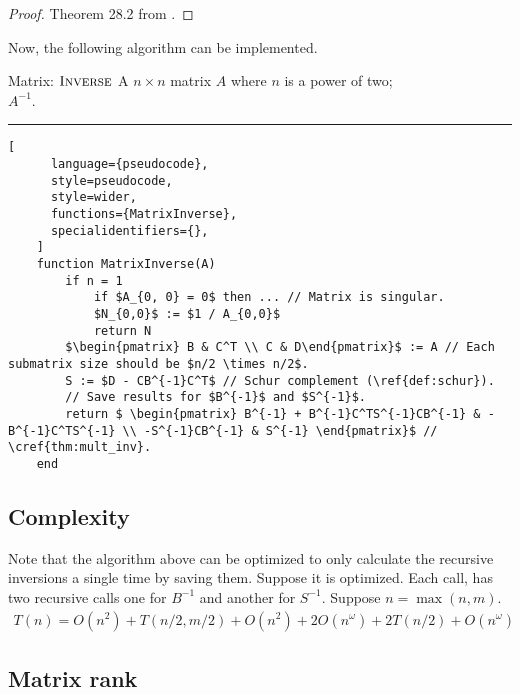 \begin{proof}
    Theorem 28.2 from \citet{CLRS}.
\end{proof}

Now, the following algorithm can be implemented.
\begin{programruledcaption}{Matrix: \(\textsc{Inverse}\)}
    \noindent
     A \(n \times n\) matrix \(A\) where \(n\) is a power of two; \\
     \(A^{-1}\). 

    \noindent \hrule
    \begin{lstlisting}[
      language={pseudocode},
      style=pseudocode,
      style=wider,
      functions={MatrixInverse},
      specialidentifiers={},
    ]
    function MatrixInverse(A) 
        if n = 1  
            if $A_{0, 0} = 0$ then ... // Matrix is singular.
            $N_{0,0}$ := $1 / A_{0,0}$
            return N
        $\begin{pmatrix} B & C^T \\ C & D\end{pmatrix}$ := A // Each submatrix size should be $n/2 \times n/2$.
        S := $D - CB^{-1}C^T$ // Schur complement (\ref{def:schur}).
        // Save results for $B^{-1}$ and $S^{-1}$.
        return $ \begin{pmatrix} B^{-1} + B^{-1}C^TS^{-1}CB^{-1} & -B^{-1}C^TS^{-1} \\ -S^{-1}CB^{-1} & S^{-1} \end{pmatrix}$ // \cref{thm:mult_inv}.
    end
    \end{lstlisting}
\end{programruledcaption}

\subsection*{Complexity}
Note that the algorithm above can be optimized to only calculate the recursive inversions a single time by saving them.
Suppose it is optimized.
Each call, has two recursive calls one for \(B^{-1}\) and another for \(S^{-1}\).
Suppose \(n = \max(n, m)\).
\begin{align}
    T(n) = O(n^2) + T(n/2, m/2) + O(n^2) + 2O(n^\omega) + 2T(n/2) + O(n^\omega)
\end{align}

\subsection{Matrix rank}
